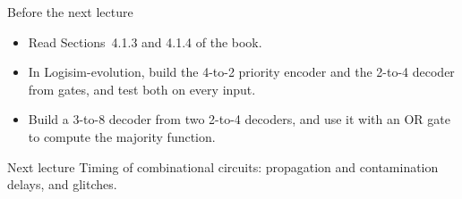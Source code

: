\documentclass[10pt]{wosm-slides}
\begin{document}
\begin{frame}{Before the next lecture}
  \begin{itemize}
    \item Read Sections~4.1.3 and 4.1.4 of the book.
    \item In Logisim-evolution, build the 4-to-2 priority encoder and the 2-to-4
      decoder from gates, and test both on every input.
    \item Build a 3-to-8 decoder from two 2-to-4 decoders, and use it with an OR
      gate to compute the majority function.
  \end{itemize}

  \begin{block}{Next lecture }
    Timing of combinational circuits: propagation and contamination delays, and
    glitches.
  \end{block}
\end{frame}
\end{document}
